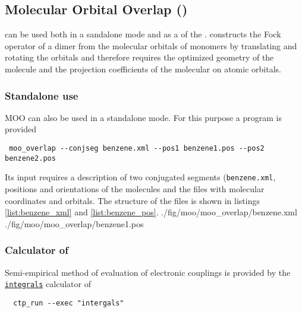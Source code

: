 \newcommand{\integrals}{\hyperref[calc:integrals]{\texttt{integrals}}\xspace}

\subsection{Molecular Orbital Overlap (\moo)}

\moo can be used both in a sandalone mode and as a \calculator of the \votcact. \moo constructs the Fock operator of a dimer from the  molecular orbitals of monomers by translating and rotating the orbitals and therefore requires the optimized geometry of the molecule and the projection coefficients of the molecular on atomic orbitals. 


\subsubsection{Standalone use}
MOO can also be used in a standalone mode. For this purpose a program \overlap is provided 
\begin{verbatim}
 moo_overlap --conjseg benzene.xml --pos1 benzene1.pos --pos2 benzene2.pos
\end{verbatim}
Its input requires a description of two conjugated segments (\texttt{benzene.xml}, positions and orientations of the molecules and the files with molecular coordinates and orbitals. The structure of the files is shown in listings \ref{list:benzene_xml} and  \ref{list:benzene_pos}.
\vskip 0.1cm
 {./fig/moo/moo_overlap/benzene.xml}
\vskip 0.1cm
 {./fig/moo/moo_overlap/benzene1.pos}


\subsubsection{Calculator of \votcact}
Semi-empirical method of evaluation of electronic couplings is provided by the \integrals calculator of  \ctprun
\begin{verbatim}
  ctp_run --exec "intergals"
\end{verbatim}


